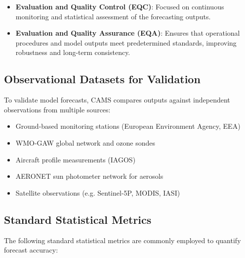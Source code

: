 \begin{itemize}
	\item \textbf{Evaluation and Quality Control (EQC)}: Focused on continuous monitoring and statistical assessment of the forecasting outputs.
	\item \textbf{Evaluation and Quality Assurance (EQA)}: Ensures that operational procedures and model outputs meet predetermined standards, improving robustness and long-term consistency.
\end{itemize}

\subsection{Observational Datasets for Validation}
To validate model forecasts, CAMS compares outputs against independent observations from multiple sources:

\begin{itemize}
	\item Ground-based monitoring stations (European Environment Agency, EEA)
	\item WMO-GAW global network and ozone sondes
	\item Aircraft profile measurements (IAGOS)
	\item AERONET sun photometer network for aerosols
	\item Satellite observations (e.g. Sentinel-5P, MODIS, IASI)
\end{itemize}

\subsection{Standard Statistical Metrics}
The following standard statistical metrics are commonly employed to quantify forecast accuracy:



